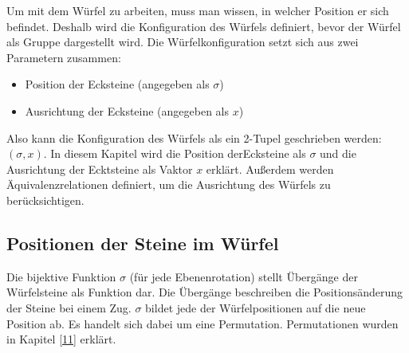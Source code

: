 \documentclass[12pt,a4paper, usenames, dvipsnames]{article}
\begin{document}
\label{26}
Um mit dem Würfel zu arbeiten, muss man wissen, in welcher Position er sich befindet.
Deshalb wird die Konfiguration des Würfels definiert, bevor der Würfel als Gruppe dargestellt wird. Die Würfelkonfiguration setzt sich aus zwei Parametern zusammen: 
\begin{itemize}
\item Position der Ecksteine (angegeben als $\sigma$)
\item Ausrichtung der Ecksteine (angegeben als $x$)
\end{itemize}
Also kann die Konfiguration des Würfels als ein 2-Tupel geschrieben werden: $(\sigma, x)$.
In diesem Kapitel wird die Position derEcksteine als $\sigma$ und die Ausrichtung der Ecktsteine als Vaktor $x$ erklärt. 
Außerdem werden Äquivalenzrelationen definiert, um die Ausrichtung des Würfels zu berücksichtigen.

%
%
%
%
%
%
%
%
%
%
%
%
%
%
%
%
%
%
%
%
\subsection*{Positionen der Steine im Würfel} 

Die bijektive Funktion $\sigma$ (für jede Ebenenrotation) stellt Übergänge der Würfelsteine als Funktion dar. Die Übergänge beschreiben die Positionsänderung der Steine bei einem Zug. $\sigma$ bildet jede der Würfelpositionen auf die neue Position ab. Es handelt sich dabei um eine Permutation. Permutationen wurden in Kapitel \ref{11} erklärt. 
\end{document}
